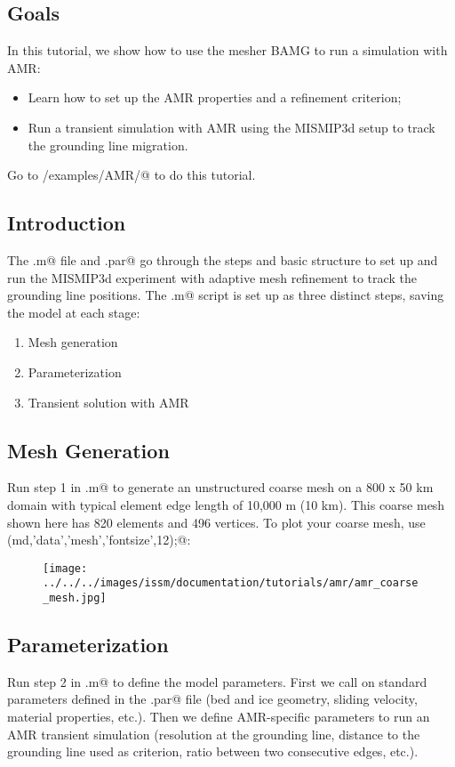 \subsection{Goals} %
In this tutorial, we show how to use the mesher BAMG to run a simulation with AMR:
\begin{itemize}
	\item Learn how to set up the AMR properties and a refinement criterion;
	\item Run a transient simulation with AMR using the MISMIP3d setup to track the grounding line migration.
\end{itemize} 

Go to \verb@trunk/examples/AMR/@ to do this tutorial.
\subsection{Introduction}
The \verb@runme.m@ file and \verb@mismip.par@ go through the steps and basic structure to set up and run the MISMIP3d experiment with adaptive mesh refinement to track the grounding line positions. The \verb@runme.m@ script is set up as three distinct steps, saving the model at each stage:
\begin{enumerate}
	\item Mesh generation
	\item Parameterization
	\item Transient solution with AMR
\end{enumerate}

\subsection{Mesh Generation}
Run step 1 in \verb@runme.m@ to generate an unstructured coarse mesh on a 800 x 50 km domain with typical element edge length of 10,000 m (10 km).  This coarse mesh shown here has 820 elements and 496 vertices. To plot your coarse mesh, use \verb@plotmodel(md,'data','mesh','fontsize',12);@:
\begin{figure}[H]
	\begin{center}
		\texttt{[image: ../../../images/issm/documentation/tutorials/amr/amr\_coarse\_mesh.jpg]}
	\end{center}
\end{figure}

\subsection{Parameterization}
Run step 2 in \verb@runme.m@ to define the model parameters. First we call on standard parameters defined in the \verb@mismip.par@ file (bed and ice geometry, sliding velocity, material properties, etc.). Then we define AMR-specific parameters to run an AMR transient simulation (resolution at the grounding line, distance to the grounding line used as criterion, ratio between two consecutive edges, etc.).

